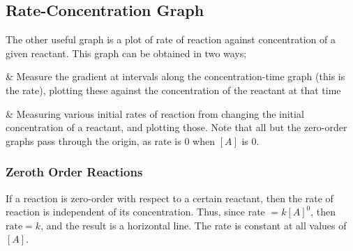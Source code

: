



		\pagebreak
		\subsection{Rate-Concentration Graph}

			The other useful graph is a plot of rate of reaction against concentration of a given reactant. This graph can be
			obtained in two ways;

			\begin{bulletlist}
				& Measure the gradient at intervals along the concentration-time graph (this is the rate), plotting these against the
				concentration of the reactant at that time

				& Measuring various initial rates of reaction from changing the initial concentration of a reactant, and plotting those.
				Note that all but the zero-order graphs pass through the origin, as rate is 0 when $[A]$ is 0.
			\end{bulletlist}


			\subsubsection{Zeroth Order Reactions}

				If a reaction is zero-order with respect to a certain reactant, then the rate of reaction is independent of its concentration.
				Thus, since rate $= k[A]^{0}$, then $\mathrm{rate} = k$, and the result is a horizontal line. The rate is constant at all values of $[A]$.




